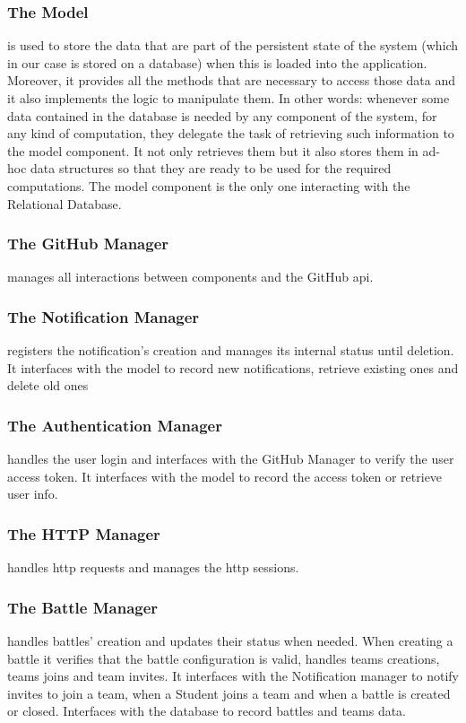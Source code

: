 \documentclass{article}
\begin{document}
\subsubsection{The Model}
is used to store the data that are part of the persistent state of the system (which in our case is stored on a database) when this is loaded into the application. Moreover, it provides all the methods that are necessary to access those data and it also implements the logic to manipulate them. In other words: whenever some data contained in the database is needed by any component of the system, for any kind of computation, they delegate the task of retrieving such information to the model component. It not only retrieves them but it also stores them in ad-hoc data structures so that they are ready to be used for the required computations. The model component is the only one interacting with the Relational Database. 
\subsubsection{The GitHub Manager}
manages all interactions between components and the GitHub api.
\subsubsection{The Notification Manager}
registers the notification’s creation and manages its internal status until deletion. It interfaces with the model to record new notifications, retrieve existing ones and delete old ones
\subsubsection{The Authentication Manager}
handles the user login and interfaces with the GitHub Manager to verify the user access token. It interfaces with the model to record the access token or retrieve user info.
\subsubsection{The HTTP Manager}
handles http requests and manages the http sessions. 
\subsubsection{The Battle Manager}
handles battles’ creation and updates their status when needed. When creating a battle it verifies that the battle configuration is valid, handles teams creations, teams joins and team invites. It interfaces with the Notification manager to notify invites to join a team, when a Student joins a team and when a battle is created or closed. Interfaces with the database to record battles and teams data.
\end{document}
